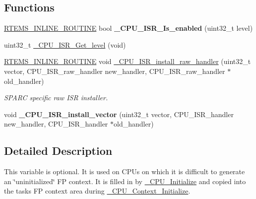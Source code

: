 \subsection*{Functions}
\begin{DoxyCompactItemize}
\item 
\mbox{\label{group__RTEMSScoreCPUlm32Interrupt_ga5254669b54a06e96ebb585fd50a02c4d}} 
\mbox{\hyperlink{group__RTEMSScoreBaseDefs_gac216239df231d5dbd15e3520b0b9313f}{R\+T\+E\+M\+S\+\_\+\+I\+N\+L\+I\+N\+E\+\_\+\+R\+O\+U\+T\+I\+NE}} bool {\bfseries \+\_\+\+C\+P\+U\+\_\+\+I\+S\+R\+\_\+\+Is\+\_\+enabled} (uint32\+\_\+t level)
\item 
uint32\+\_\+t \mbox{\hyperlink{group__RTEMSScoreCPUlm32Interrupt_ga1d9dcab9170d532b6634a5620385adbd}{\+\_\+\+C\+P\+U\+\_\+\+I\+S\+R\+\_\+\+Get\+\_\+level}} (void)
\item 
\mbox{\hyperlink{group__RTEMSScoreBaseDefs_gac216239df231d5dbd15e3520b0b9313f}{R\+T\+E\+M\+S\+\_\+\+I\+N\+L\+I\+N\+E\+\_\+\+R\+O\+U\+T\+I\+NE}} void \mbox{\hyperlink{group__RTEMSScoreCPUlm32Interrupt_gaa993b7752d5db306f85586ac400432ab}{\+\_\+\+C\+P\+U\+\_\+\+I\+S\+R\+\_\+install\+\_\+raw\+\_\+handler}} (uint32\+\_\+t vector, C\+P\+U\+\_\+\+I\+S\+R\+\_\+raw\+\_\+handler new\+\_\+handler, C\+P\+U\+\_\+\+I\+S\+R\+\_\+raw\+\_\+handler $\ast$old\+\_\+handler)
\begin{DoxyCompactList}\small\item\em S\+P\+A\+RC specific raw I\+SR installer. \end{DoxyCompactList}\item 
\mbox{\label{group__RTEMSScoreCPUlm32Interrupt_gaa3480454768ad843ce97909111a48a1f}} 
void {\bfseries \+\_\+\+C\+P\+U\+\_\+\+I\+S\+R\+\_\+install\+\_\+vector} (uint32\+\_\+t vector, C\+P\+U\+\_\+\+I\+S\+R\+\_\+handler new\+\_\+handler, C\+P\+U\+\_\+\+I\+S\+R\+\_\+handler $\ast$old\+\_\+handler)
\end{DoxyCompactItemize}


\subsection{Detailed Description}
This variable is optional. It is used on C\+P\+Us on which it is difficult to generate an \char`\"{}uninitialized\char`\"{} FP context. It is filled in by \mbox{\hyperlink{group__RTEMSScoreCPUARM_ga869484e3d851b032fd826c69ff21fc72}{\+\_\+\+C\+P\+U\+\_\+\+Initialize}} and copied into the task\textquotesingle{}s FP context area during \mbox{\hyperlink{group__RTEMSScoreCPUARM_gaa92701994ad8e3b646667a3e92935ddf}{\+\_\+\+C\+P\+U\+\_\+\+Context\+\_\+\+Initialize}}.

